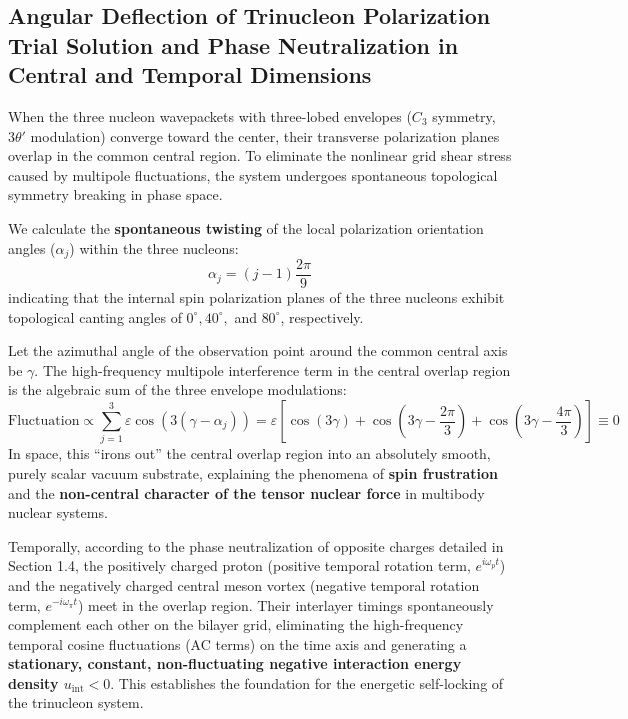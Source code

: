 \documentclass[12pt, a4paper]{article}
\begin{document}
\subsection{Angular Deflection of Trinucleon Polarization Trial Solution and Phase Neutralization in Central and Temporal Dimensions}

When the three nucleon wavepackets with three-lobed envelopes ($C_3$ symmetry, $3\theta'$ modulation) converge toward the center, their transverse polarization planes overlap in the common central region. To eliminate the nonlinear grid shear stress caused by multipole fluctuations, the system undergoes spontaneous topological symmetry breaking in phase space.

We calculate the \textbf{spontaneous twisting} of the local polarization orientation angles ($\alpha_j$) within the three nucleons:
\begin{equation}
\alpha_j = (j-1)\frac{2\pi}{9}
\end{equation}
indicating that the internal spin polarization planes of the three nucleons exhibit topological canting angles of $0^\circ, 40^\circ,$ and $80^\circ$, respectively.

Let the azimuthal angle of the observation point around the common central axis be $\gamma$. The high-frequency multipole interference term in the central overlap region is the algebraic sum of the three envelope modulations:
\begin{equation}
\mathrm{Fluctuation} \propto \sum_{j=1}^3 \varepsilon \cos\left(3(\gamma - \alpha_j)\right) = \varepsilon \left[ \cos(3\gamma) + \cos\left(3\gamma - \frac{2\pi}{3}\right) + \cos\left(3\gamma - \frac{4\pi}{3}\right) \right] \equiv 0
\end{equation}
In space, this ``irons out'' the central overlap region into an absolutely smooth, purely scalar vacuum substrate, explaining the phenomena of \textbf{spin frustration} and the \textbf{non-central character of the tensor nuclear force} in multibody nuclear systems.

Temporally, according to the phase neutralization of opposite charges detailed in Section 1.4, the positively charged proton (positive temporal rotation term, $e^{i\omega_p t}$) and the negatively charged central meson vortex (negative temporal rotation term, $e^{-i\omega_\pi t}$) meet in the overlap region. Their interlayer timings spontaneously complement each other on the bilayer grid, eliminating the high-frequency temporal cosine fluctuations (AC terms) on the time axis and generating a \textbf{stationary, constant, non-fluctuating negative interaction energy density $u_{\mathrm{int}} < 0$}. This establishes the foundation for the energetic self-locking of the trinucleon system.
\end{document}
